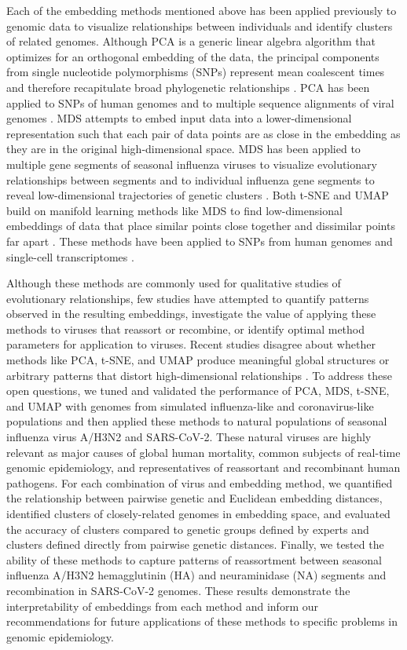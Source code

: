 \documentclass[webpdf,contemporary,large,single]{oup-authoring-template}%
\theoremstyle{thmstyleone}%
\theoremstyle{thmstyletwo}%
\theoremstyle{thmstylethree}%
\begin{document}
Each of the embedding methods mentioned above has been applied previously to genomic data to visualize relationships between individuals and identify clusters of related genomes.
Although PCA is a generic linear algebra algorithm that optimizes for an orthogonal embedding of the data, the principal components from single nucleotide polymorphisms (SNPs) represent mean coalescent times and therefore recapitulate broad phylogenetic relationships \citep{mcvean_2009}.
PCA has been applied to SNPs of human genomes \citep{novembre_2008,alexander_2009,mcvean_2009,auton_2015} and to multiple sequence alignments of viral genomes \citep{metsky_2017}.
MDS attempts to embed input data into a lower-dimensional representation such that each pair of data points are as close in the embedding as they are in the original high-dimensional space.
MDS has been applied to multiple gene segments of seasonal influenza viruses to visualize evolutionary relationships between segments \citep{rambaut_2008} and to individual influenza gene segments to reveal low-dimensional trajectories of genetic clusters \citep{He2010,Ito2011}.
Both t-SNE and UMAP build on manifold learning methods like MDS to find low-dimensional embeddings of data that place similar points close together and dissimilar points far apart \citep{kobak_2021}.
These methods have been applied to SNPs from human genomes \citep{diaz-papkovich_2019} and single-cell transcriptomes \citep{becht_2018,kobak_2019}.

Although these methods are commonly used for qualitative studies of evolutionary relationships, few studies have attempted to quantify patterns observed in the resulting embeddings, investigate the value of applying these methods to viruses that reassort or recombine, or identify optimal method parameters for application to viruses.
Recent studies disagree about whether methods like PCA, t-SNE, and UMAP produce meaningful global structures \citep{kobak_2021} or arbitrary patterns that distort high-dimensional relationships \citep{Chari2023}.
To address these open questions, we tuned and validated the performance of PCA, MDS, t-SNE, and UMAP with genomes from simulated influenza-like and coronavirus-like populations and then applied these methods to natural populations of seasonal influenza virus A/H3N2 and SARS-CoV-2.
These natural viruses are highly relevant as major causes of global human mortality, common subjects of real-time genomic epidemiology, and representatives of reassortant and recombinant human pathogens.
For each combination of virus and embedding method, we quantified the relationship between pairwise genetic and Euclidean embedding distances, identified clusters of closely-related genomes in embedding space, and evaluated the accuracy of clusters compared to genetic groups defined by experts and clusters defined directly from pairwise genetic distances.
Finally, we tested the ability of these methods to capture patterns of reassortment between seasonal influenza A/H3N2 hemagglutinin (HA) and neuraminidase (NA) segments and recombination in SARS-CoV-2 genomes.
These results demonstrate the interpretability of embeddings from each method and inform our recommendations for future applications of these methods to specific problems in genomic epidemiology.
\end{document}
